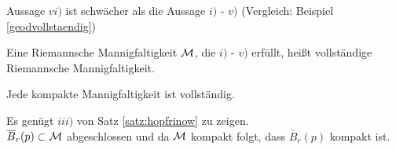 \begin{bem}
Aussage $vi)$ ist schwächer als die Aussage $i)$ - $v)$ 
(Vergleich: Beispiel \ref{geodvollstaendig}) 
\end{bem}


\begin{defs}
    Eine Riemannsche Mannigfaltigkeit $\mathcal{M}$, die  $i)$ - $v)$ erfüllt, 
    heißt vollständige Riemannsche Mannigfaltigkeit.
\end{defs}

\begin{kor}
    \label{kor:kompaktvoll}
    Jede kompakte Mannigfaltigkeit ist vollständig.
\end{kor}
\begin{bew}
Es genügt $iii)$ von Satz \ref{satz:hopfrinow} zu zeigen.\\
$\overline{B}_r(p) \subset \mathcal{M}$ abgeschlossen und da $\mathcal{M}$ kompakt folgt, 
dass $\overline{B}_r (p)$ kompakt ist.    
\end{bew}


